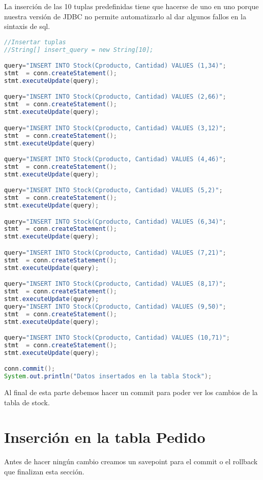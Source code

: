 La inserción de las 10 tuplas predefinidas tiene que hacerse de uno en uno porque nuestra versión de JDBC no permite automatizarlo al dar algunos fallos en la sintaxis de sql.

\begin{lstlisting}[language=Java]
//Insertar tuplas
//String[] insert_query = new String[10];

query="INSERT INTO Stock(Cproducto, Cantidad) VALUES (1,34)";
stmt  = conn.createStatement();
stmt.executeUpdate(query);

query="INSERT INTO Stock(Cproducto, Cantidad) VALUES (2,66)";
stmt  = conn.createStatement();
stmt.executeUpdate(query);

query="INSERT INTO Stock(Cproducto, Cantidad) VALUES (3,12)";
stmt  = conn.createStatement();
stmt.executeUpdate(query)

query="INSERT INTO Stock(Cproducto, Cantidad) VALUES (4,46)";
stmt  = conn.createStatement();
stmt.executeUpdate(query);

query="INSERT INTO Stock(Cproducto, Cantidad) VALUES (5,2)";
stmt  = conn.createStatement();
stmt.executeUpdate(query);

query="INSERT INTO Stock(Cproducto, Cantidad) VALUES (6,34)";
stmt  = conn.createStatement();
stmt.executeUpdate(query);

query="INSERT INTO Stock(Cproducto, Cantidad) VALUES (7,21)";
stmt  = conn.createStatement();
stmt.executeUpdate(query);

query="INSERT INTO Stock(Cproducto, Cantidad) VALUES (8,17)";
stmt  = conn.createStatement();
stmt.executeUpdate(query);
query="INSERT INTO Stock(Cproducto, Cantidad) VALUES (9,50)";
stmt  = conn.createStatement();
stmt.executeUpdate(query);

query="INSERT INTO Stock(Cproducto, Cantidad) VALUES (10,71)";
stmt  = conn.createStatement();
stmt.executeUpdate(query);

conn.commit();
System.out.println("Datos insertados en la tabla Stock");
\end{lstlisting}

Al final de esta parte debemos hacer un commit para poder ver los cambios de la tabla de stock.

\section{Inserción en la tabla Pedido}

Antes de hacer ningún cambio creamos un savepoint para el commit o el rollback que finalizan esta sección.

